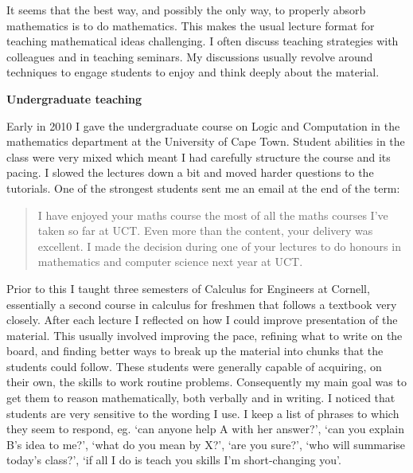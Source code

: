 \documentclass{article}
\theoremstyle{plain} \numberwithin{equation}{section}
\theoremstyle{definition}
\begin{document}
\thispagestyle{fancy}

It seems that the best way, and possibly the only way, to properly absorb mathematics is to do mathematics. 
This makes the usual lecture format for teaching mathematical ideas challenging. I often discuss teaching strategies with colleagues and in teaching seminars.
My discussions usually revolve around techniques to engage students to enjoy and think deeply about the material.

{\bf Undergraduate teaching}

Early in 2010 I gave the undergraduate course on Logic and Computation in the mathematics department at the University of Cape Town. Student abilities in the class were very mixed which meant I had carefully structure the course and its pacing. I slowed the lectures down a bit and moved harder questions to the tutorials. One of the strongest students sent me an email at the end of the term:
\begin{quote}
I have enjoyed your maths course the most of all the maths courses I've taken so far at UCT. Even more than the content, your delivery was excellent.
I made the decision during one of your lectures to do honours in mathematics and computer science next year at UCT. 
\end{quote}

Prior to this I taught three semesters of Calculus for Engineers at Cornell, essentially a second course in calculus for freshmen that follows a textbook very closely.
After each lecture I reflected on how I could improve presentation of the material. This usually involved improving the pace, refining what to write on the board, and finding better ways to break up the material into chunks that the students could follow. These students were generally capable of acquiring, on their own, the skills to work routine problems.
Consequently my main goal  was to get them to reason mathematically, both verbally and in writing. 
I noticed that students are very sensitive to the wording I use.
I keep a list of phrases to which they seem to respond, eg.  `can anyone help A with her answer?', `can you explain B's idea to me?', `what do you mean by X?',
`are you sure?', `who will summarise today's class?', `if all I do is teach you skills I'm short-changing you'.

\end{document}

